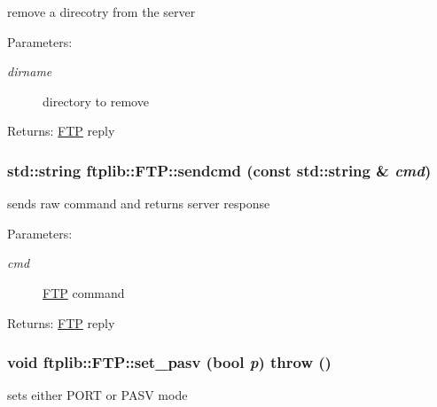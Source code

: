 remove a direcotry from the server 

\begin{Desc}
\item[Parameters:]
\begin{description}
\item[{\em dirname}]directory to remove \end{description}
\end{Desc}
\begin{Desc}
\item[Returns:]\hyperlink{classftplib_1_1FTP}{FTP} reply \end{Desc}
\hypertarget{classftplib_1_1FTP_5a876d670107df4b5924238450440eee}{
\subsubsection[{sendcmd}]{\setlength{\rightskip}{0pt plus 5cm}std::string ftplib::FTP::sendcmd (const std::string \& {\em cmd})}}
\label{classftplib_1_1FTP_5a876d670107df4b5924238450440eee}


sends raw command and returns server response 

\begin{Desc}
\item[Parameters:]
\begin{description}
\item[{\em cmd}]\hyperlink{classftplib_1_1FTP}{FTP} command \end{description}
\end{Desc}
\begin{Desc}
\item[Returns:]\hyperlink{classftplib_1_1FTP}{FTP} reply \end{Desc}
\hypertarget{classftplib_1_1FTP_e35230239f093f01fb295ccb007de1b2}{
\subsubsection[{set\_\-pasv}]{\setlength{\rightskip}{0pt plus 5cm}void ftplib::FTP::set\_\-pasv (bool {\em p})  throw ()}}
\label{classftplib_1_1FTP_e35230239f093f01fb295ccb007de1b2}


sets either PORT or PASV mode 

